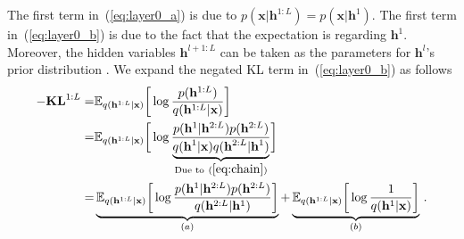 \documentclass[twoside]{article}
\begin{document}
The first term in~(\ref{eq:layer0_a}) is due to $p(\mathbf{x}|\mathbf{h}^{1:L}) =  p(\mathbf{x}|\mathbf{h}^{1})$. 
The first term in~(\ref{eq:layer0_b}) is due to the fact that the expectation is regarding $\mathbf{h}^{1}$. 
Moreover, the hidden variables $\mathbf{h}^{l+1:L}$ can be taken as the parameters for $\mathbf{h}^l$'s  prior distribution .  
We expand the negated KL term in~(\ref{eq:layer0_b}) as follows
\begin{align} \label{eq:kl_1}
-\textbf{\text{KL}}^{1:L} =& \mathbb{E}_{q(\mathbf{h}^{1:L} | \mathbf{x})} \bigg[ \log  \frac{p( \mathbf{h}^{1:L})}{q(\mathbf{h}^{1:L}|\mathbf{x})}  \bigg]   \\ \notag
= &   \mathbb{E}_{q(\mathbf{h}^{1:L} | \mathbf{x})} \bigg[ \log  \frac{p( \mathbf{h}^{1}|  \mathbf{h}^{2:L}) p( \mathbf{h}^{2:L})  }{\underbrace{ q(\mathbf{h}^{1}|\mathbf{x}) q(\mathbf{h}^{2:L}|\mathbf{h}^1)}_{\text{Due to}~(\ref{eq:chain}) } }  \bigg] \\ \notag
=&  \underbrace{  \mathbb{E}_{q(\mathbf{h}^{1:L} | \mathbf{x})} \bigg[ \log  \frac{p( \mathbf{h}^{1}|  \mathbf{h}^{2:L}) p( \mathbf{h}^{2:L})  }{ q(\mathbf{h}^{2:L}|\mathbf{h}^1)}  \bigg]  }_{(a)} +   \underbrace{\mathbb{E}_{q(\mathbf{h}^{1:L} | \mathbf{x})} \bigg[ \log \frac{1}{q(\mathbf{h}^{1}|\mathbf{x}) } \bigg] }_{(b)} \, .  \notag
\end{align}
\end{document}
